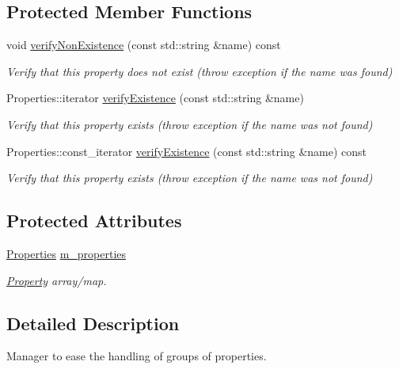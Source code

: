 \subsection*{Protected Member Functions}
\begin{DoxyCompactItemize}
\item 
void \hyperlink{class_d_d4hep_1_1_property_manager_a3f9b2e806a1fc63f08e2cdff0039ac5c}{verify\+Non\+Existence} (const std\+::string \&name) const
\begin{DoxyCompactList}\small\item\em Verify that this property does not exist (throw exception if the name was found) \end{DoxyCompactList}\item 
Properties\+::iterator \hyperlink{class_d_d4hep_1_1_property_manager_a7a616dc476e887cb58420916af7d22a0}{verify\+Existence} (const std\+::string \&name)
\begin{DoxyCompactList}\small\item\em Verify that this property exists (throw exception if the name was not found) \end{DoxyCompactList}\item 
Properties\+::const\+\_\+iterator \hyperlink{class_d_d4hep_1_1_property_manager_ae9ff33ccd648dec359cf4e0d3951b167}{verify\+Existence} (const std\+::string \&name) const
\begin{DoxyCompactList}\small\item\em Verify that this property exists (throw exception if the name was not found) \end{DoxyCompactList}\end{DoxyCompactItemize}
\subsection*{Protected Attributes}
\begin{DoxyCompactItemize}
\item 
\hyperlink{class_d_d4hep_1_1_property_manager_af9bc1c909d5489219e0f9e97b16dab6f}{Properties} \hyperlink{class_d_d4hep_1_1_property_manager_af966b46276f15f24b36f7e88006bd098}{m\+\_\+properties}
\begin{DoxyCompactList}\small\item\em \hyperlink{class_d_d4hep_1_1_property}{Property} array/map. \end{DoxyCompactList}\end{DoxyCompactItemize}


\subsection{Detailed Description}
Manager to ease the handling of groups of properties. 

